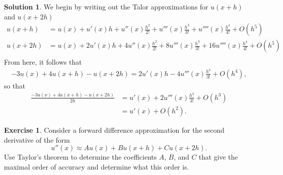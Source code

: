 \documentclass[12pt]{article}
\theoremstyle{definition}
\newtheorem{exer}{Exercise}
\newtheorem{sol}{Solution}
\theoremstyle{remark}
\begin{document}
\begin{sol}
    We begin by writing out the Talor approximations for $u(x+h)$ and $u(x + 2h)$
    \begin{align*}
        u(x + h) &= u(x) + u'(x)h + u''(x) \frac{h^2}{2!} + u'''(x) \frac{h^{3}}{3!} + u''''(x) \frac{h^{4}}{4!} + O(h^{5})\\
        u(x +2h) &= u(x) +  2u'(x)h + 4 u''(x) \frac{h^2}{2!} + 8 u'''(x) \frac{h^{3}}{3!} + 16 u''''(x) \frac{h^{4}}{4!} + O(h^{5})\\
    \end{align*}
    From here, it follows that 
    \begin{align*}
        -3 u(x) + 4 u(x + h) - u(x + 2h) = 2u'(x)h - 4 u'''(x) \frac{h^{3}}{3!} + O(h^{4}),
    \end{align*}
    so that 
    \begin{align*}
        \frac{ -3 u(x) + 4 u(x + h) - u(x + 2h)}{2h} &= u'(x) + 2 u'''(x) \frac{h^{2}}{3!} + O(h^{3})\\
                                                     &= u'(x) + O(h^{2}).
    \end{align*}
\end{sol}

\newpage

\begin{exer}
    Consider a forward difference approximation for the second derivative
of the form
\[
u'' (x) \approx A u(x) + B u(x+h) + C u(x+2h) .
\]
Use Taylor's theorem to determine the coefficients $A$, $B$, and $C$
that give the maximal order of accuracy and determine what this order is.
\end{exer}
\end{document}
